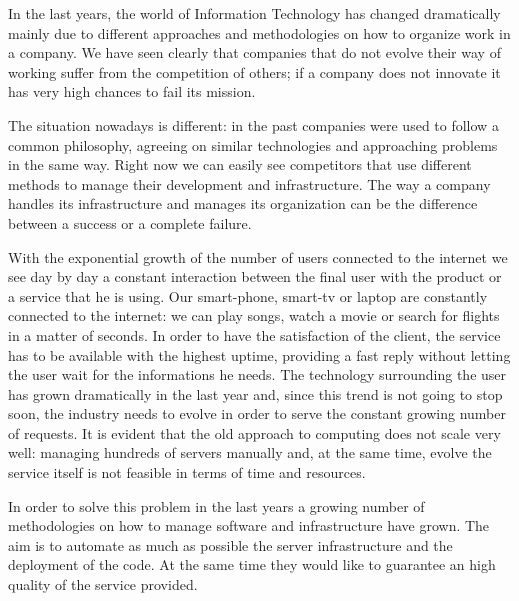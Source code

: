 

In the last years, the world of Information Technology has changed
dramatically mainly due to different approaches and methodologies on how
to organize work in a company. We have seen clearly that companies that do
not evolve their way of working suffer from the competition of others; if
a company does not innovate it has very high chances to fail its mission.

The situation nowadays is different: in the past companies were used to
follow a common philosophy, agreeing on similar technologies and
approaching problems in the same way. Right now we can easily see
competitors that use different methods to manage their development and
infrastructure. The way a company handles its infrastructure and manages
its organization can be the difference between a success or a complete
failure.

With the exponential growth of the number of users connected to the
internet we see day by day a constant interaction between the final user
with the product or a service that he is using. Our smart-phone, smart-tv
or laptop are constantly connected to the internet: we can play songs,
watch a movie or search for flights in a matter of seconds. In order to
have the satisfaction of the client, the service has to be available with
the highest uptime, providing a fast reply without letting the user wait
for the informations he needs. The technology surrounding the user has
grown dramatically in the last year and, since this trend is not going to
stop soon, the industry needs to evolve in order to serve the constant
growing number of requests. It is evident that the old approach to
computing does not scale very well: managing hundreds of servers manually
and, at the same time, evolve the service itself is not feasible in terms
of time and resources.

In order to solve this problem in the last years a growing number of
methodologies on how to manage software and infrastructure have grown. The
aim is to automate as much as possible the server infrastructure and the
deployment of the code. At the same time they would like to guarantee an
high quality of the service provided.


